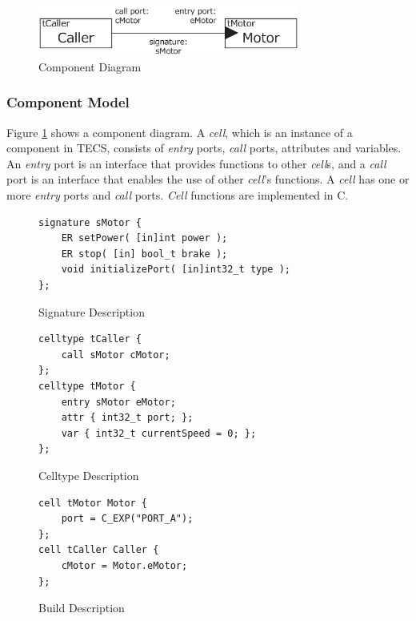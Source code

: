 \documentclass[conference]{IEEEtran/IEEEtran/IEEEtran}
\begin{document}
\begin{figure}[t]
    \centering
    \includegraphics[width=8.6cm,clip]{figure/component_diagram.eps}
    \vspace{-2mm}
    \caption{Component Diagram}
    \vspace{-5mm}
    \label{fig:component}
\end{figure}

\subsubsection{Component Model}
Figure \ref{fig:component} shows a component diagram.
A {\it cell}, which is an instance of a component in TECS, consists of {\it entry} ports, {\it call} ports, attributes and variables.
An {\it entry} port is an interface that provides functions to other {\it cell}s, and a {\it call} port is an interface that enables the use of other {\it cell}'s functions.
A {\it cell} has one or more {\it entry} ports and {\it call} ports.
{\it Cell} functions are implemented in C.

\begin{figure}[H]
\centering
\begin{lstlisting}
signature sMotor {
    ER setPower( [in]int power );
    ER stop( [in] bool_t brake );
    void initializePort( [in]int32_t type );
};
\end{lstlisting}
    \vspace{-2mm}
\caption{Signature Description}
    \vspace{-5mm}
\label{signature}
\end{figure}

\begin{figure}[H]
\centering
\begin{lstlisting}
celltype tCaller {
    call sMotor cMotor;
};
celltype tMotor {
    entry sMotor eMotor;
    attr { int32_t port; };
    var { int32_t currentSpeed = 0; };
};
\end{lstlisting}
    \vspace{-2mm}
\caption{Celltype Description}
    \vspace{-5mm}
\label{celltype}
\end{figure}

\begin{figure}[H]
\centering
\begin{lstlisting}
cell tMotor Motor {
    port = C_EXP("PORT_A");
};
cell tCaller Caller {
    cMotor = Motor.eMotor;
};
\end{lstlisting}
    \vspace{-2mm}
\caption{Build Description}
    \vspace{-2mm}
\label{build}
\end{figure}
\end{document}
